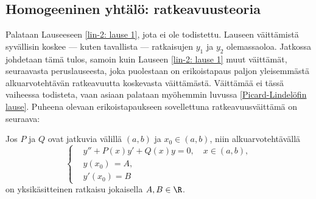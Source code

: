 \subsection*{Homogeeninen yhtälö: ratkeavuusteoria}

Palataan Lauseeseen \ref{lin-2: lause 1}, jota ei ole todistettu. Lauseen väittämistä
syvällisin koskee --- kuten tavallista --- ratkaisujen $y_1$ ja $y_2$ olemassaoloa. Jatkossa
johdetaan tämä tulos, samoin kuin Lauseen  \ref{lin-2: lause 1} muut väittämät, seuraavasta
peruslauseesta, joka puolestaan on erikoistapaus paljon yleisemmästä alkuarvotehtävän
ratkeavuutta koskevasta väittämästä. Väittämää ei tässä vaiheessa todisteta, vaan asiaan
palataan myöhemmin luvussa \ref{Picard-Lindelöfin lause}. Puheena olevaan erikoistapaukseen
sovellettuna ratkeavuusväittämä on seuraava: 
\begin{*Lause} \label{lin-2: lause 2}  
Jos $P$ ja $Q$ ovat jatkuvia välillä $(a,b)$ ja $x_0\in (a,b)$, niin alkuarvotehtävällä
\[
\left\{ \begin{aligned}
&y''+P(x)y'+Q(x)y=0,\quad x\in (a,b), \\
&y(x_0)\,=A, \\
&y'(x_0) =B
\end{aligned} \right.
\]
on yksikäsitteinen ratkaisu jokaisella $A,B\in\R$.
\end{*Lause}

